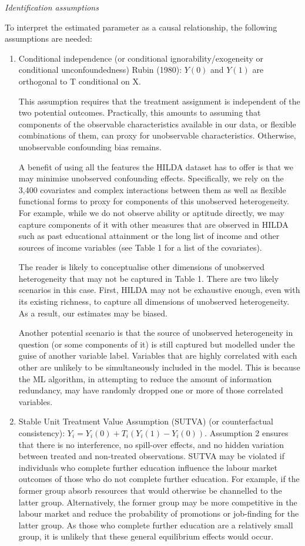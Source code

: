 \documentclass[12pt, a4paper]{article}
\begin{document}
\emph{Identification assumptions}

To interpret the estimated parameter as a causal relationship, the following assumptions are needed:

\begin{enumerate}
  \item Conditional independence (or conditional ignorability/exogeneity or conditional unconfoundedness) Rubin (1980): $Y(0)$ and $Y(1)$ are orthogonal to T conditional on X.  
  
This assumption requires that the treatment assignment is independent of the two potential outcomes. Practically, this amounts to assuming that components of the observable characteristics available in our data, or flexible combinations of them, can proxy for unobservable characteristics. Otherwise, unobservable confounding bias remains.

A benefit of using all the features the HILDA dataset has to offer is that we may minimise unobserved confounding effects. Specifically, we rely on the 3,400 covariates and complex interactions between them as well as flexible functional forms to proxy for components of this unobserved heterogeneity. For example, while we do not observe ability or aptitude directly, we may capture components of it with other measures that are observed in HILDA such as past educational attainment or the long list of income and other sources of income variables (see Table 1 for a list of the covariates). 

The reader is likely to conceptualise other dimensions of unobserved heterogeneity that may not be captured in Table 1. There are two likely scenarios in this case. First, HILDA may not be exhaustive enough, even with its existing richness, to capture all dimensions of unobserved heterogeneity. As a result, our estimates may be biased. 

Another potential scenario is that the source of unobserved heterogeneity in question (or some components of it) is still captured but modelled under the guise of another variable label. Variables that are highly correlated with each other are unlikely to be simultaneously included in the model. This is because the ML algorithm, in attempting to reduce the amount of information redundancy, may have randomly dropped one or more of those correlated variables. 

  \item Stable Unit Treatment Value Assumption (SUTVA) (or counterfactual consistency): $Y_i = Y_i(0) +T_i(Y_i(1) - Y_i(0))$. Assumption 2 ensures that there is no interference, no spill-over effects, and no hidden variation between treated and non-treated observations. SUTVA may be violated if individuals who complete further education influence the labour market outcomes of those who do not complete further education. For example, if the former group absorb resources that would otherwise be channelled to the latter group. Alternatively, the former group may be more competitive in the labour market and reduce the probability of promotions or job-finding for the latter group. As those who complete further education are a relatively small group, it is unlikely that these general equilibrium effects would occur. 


\end{enumerate}
\end{document}
